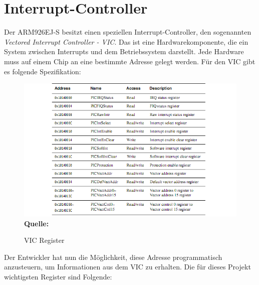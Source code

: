 \section{Interrupt-Controller}
Der ARM926EJ-S besitzt einen speziellen Interrupt-Controller, den sogenannten \textit{Vectored Interrupt Controller - VIC}. Das ist eine Hardwarekomponente, die ein System zwischen Interrupts und dem Betriebssystem darstellt. Jede Hardware muss auf einem Chip an eine bestimmte Adresse gelegt werden. F\"ur den VIC gibt es folgende Spezifikation:
\begin{figure}[H]
\center
\includegraphics[scale=0.7]{common/processor-vic.png}\\
\footnotesize\textbf{Quelle:}\parencite[224]{archManI}
\caption{VIC Register}
\end{figure}
\noindent
Der Entwickler hat nun die M\"oglichkeit, diese Adresse programmatisch anzusteuern, um Informationen aus dem VIC zu erhalten. Die f\"ur dieses Projekt wichtigsten Register sind Folgende:
